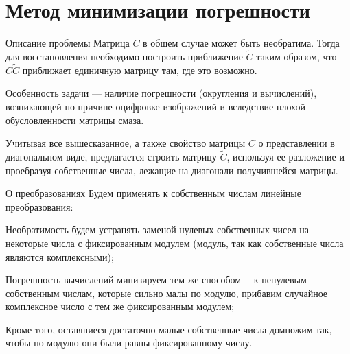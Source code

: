 \documentclass[10pt]{beamer}
\newcounter{qcounter}
\begin{document}
\section[Метод минимизации]{Метод минимизации погрешности}
\begin{frame}
\begin{block}{Описание проблемы}
Матрица $C$ в общем случае может быть необратима. Тогда для восстановления необходимо построить приближение $\tilde{C}$ таким образом, что $C\tilde{C}$ приближает единичную матрицу там, где это возможно.


Особенность задачи --- наличие погрешности (округления и вычислений), возникающей по причине оцифровке изображений и вследствие плохой обусловленности матрицы смаза.
\end{block}

\begin{block}{}
Учитывая все вышесказанное, а также свойство матрицы $C$ о представлении в диагональном виде, предлагается строить матрицу $\tilde{C}$, используя ее разложение и проебразуя собственные числа, лежащие на диагонали получившейся матрицы.
\end{block}

\end{frame}


\begin{frame}

\begin{block}{О преобразованиях}
Будем применять к собственным числам линейные преобразования:
    \begin{list}{)~}{}
        \item Необратимость будем устранять заменой нулевых собственных чисел на некоторые числа с фиксированным модулем (модуль, так как собственные числа являются комплексными);
        \item Погрешность вычислений минизируем тем же способом~-~к ненулевым собственным числам, которые сильно малы по модулю, прибавим случайное комплексное число с тем же фиксированным модулем;
        \item Кроме того, оставшиеся достаточно малые собственные числа домножим так, чтобы по модулю они были равны фиксированному числу.
    \end{list}
\end{block}

\end{frame}
\end{document}
